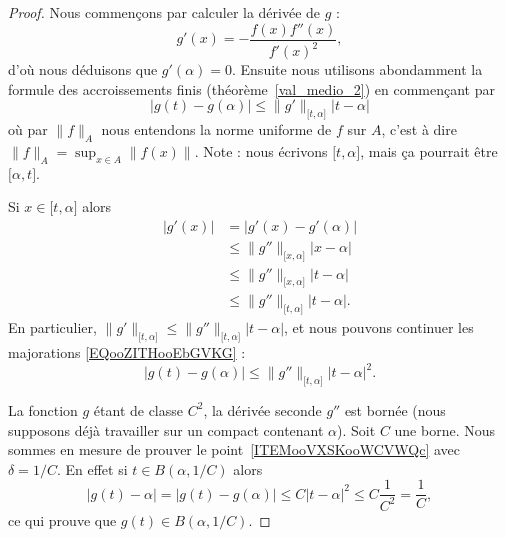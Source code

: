 \begin{proof}
    Nous commençons par calculer la dérivée de \( g\) :
    \begin{equation}
        g'(x)=-\frac{ f(x)f''(x) }{ f'(x)^2 },
    \end{equation}
    d'où nous déduisons que \( g'(\alpha)=0\). Ensuite nous utilisons abondamment la formule des accroissements finis (théorème~\ref{val_medio_2}) en commençant par
    \begin{equation}        \label{EQooZITHooEbGVKG}
        | g(t)-g(\alpha) |\leq \| g' \|_{\mathopen[ t , \alpha \mathclose]}| t-\alpha |
    \end{equation}
    où par \( \| f \|_A\) nous entendons la norme uniforme de \( f\) sur \( A\), c'est à dire \( \| f \|_A=\sup_{x\in A}\| f(x) \|\). Note : nous écrivons \( \mathopen[ t , \alpha \mathclose]\), mais ça pourrait être \( \mathopen[ \alpha , t \mathclose]\).

    Si \( x\in\mathopen[ t , \alpha \mathclose]\) alors
    \begin{subequations}
        \begin{align}
            | g'(x) |&=| g'(x)-g'(\alpha) |\\
            &\leq \| g'' \|_{\mathopen[ x , \alpha \mathclose]}| x-\alpha |\\
            &\leq \| g'' \|_{\mathopen[ x , \alpha \mathclose]}| t-\alpha |\\
            &\leq \| g'' \|_{\mathopen[ t , \alpha \mathclose]}| t-\alpha |.
        \end{align}
    \end{subequations}
    En particulier, \( \| g' \|_{\mathopen[ t , \alpha \mathclose]}\leq \| g'' \|_{\mathopen[ t , \alpha \mathclose]}| t-\alpha |\), et nous pouvons continuer les majorations \eqref{EQooZITHooEbGVKG} :
    \begin{equation}
        | g(t)-g(\alpha) |\leq \| g'' \|_{\mathopen[ t , \alpha \mathclose]}| t-\alpha |^2.
    \end{equation}

    La fonction \( g\) étant de classe \( C^2\), la dérivée seconde \( g''\) est bornée (nous supposons déjà travailler sur un compact contenant \( \alpha\)). Soit \( C\) une borne. Nous sommes en mesure de prouver le point~\ref{ITEMooVXSKooWCVWQc} avec \( \delta=1/C\). En effet si \( t\in B(\alpha,1/C)\) alors
    \begin{equation}
        | g(t)-\alpha |=| g(t)-g(\alpha) |\leq C| t-\alpha |^2\leq C\frac{1}{ C^2 }=\frac{1}{ C },
    \end{equation}
    ce qui prouve que \( g(t)\in B(\alpha,1/C)\).


\end{proof}
